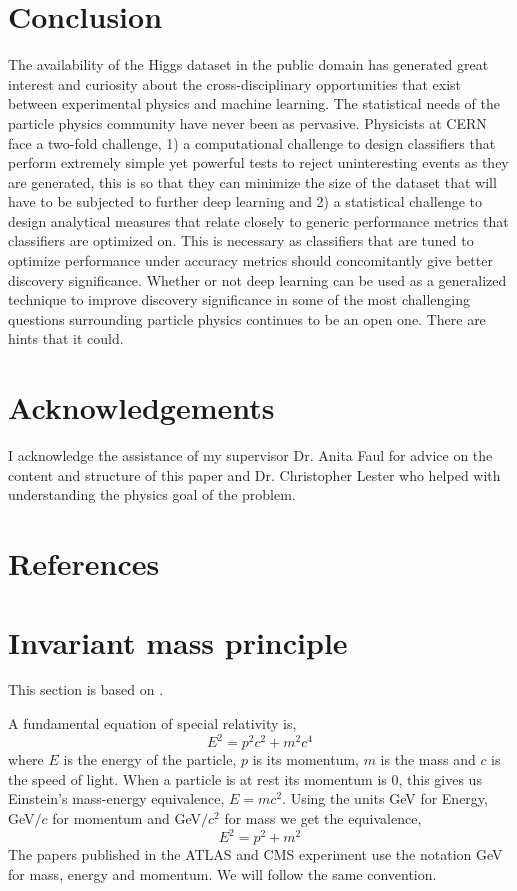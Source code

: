 \documentclass[final,3p,times,twocolumn]{elsarticle}
\begin{document}
\section{Conclusion}
The availability of the Higgs dataset in the public domain has generated great interest and curiosity about the cross-disciplinary opportunities that exist between experimental physics and machine learning. The statistical needs of the particle physics community have never been as pervasive. Physicists at CERN face a two-fold challenge, 1) a computational challenge to design classifiers that perform extremely simple yet powerful tests to reject uninteresting events as they are generated, this is so that they can minimize the size of the dataset that will have to be subjected to further deep learning and 2) a statistical challenge to design analytical measures that relate closely to generic performance metrics that classifiers are optimized on. This is necessary as classifiers that are tuned to optimize performance under accuracy metrics should concomitantly give better discovery significance. Whether or not deep learning can be used as a generalized technique to improve discovery significance in some of the most challenging questions surrounding particle physics continues to be an open one. There are hints that it could. 

\section*{Acknowledgements}

I acknowledge the assistance of my supervisor Dr. Anita Faul for advice on the content and structure of this paper and Dr. Christopher Lester who helped with understanding the physics goal of the problem. 

\section*{References}
 


\appendix

\section{Invariant mass principle}

\label{AppA}

This section is based on \cite{RM}.

A fundamental equation of special relativity is, $$ E^2 = p^2c^2 + m^2c^4 $$ where $E$ is the energy of the particle, $p$ is its momentum, $m$ is the mass and $c$ is the speed of light. When a particle is at rest its momentum is 0, this gives us Einstein's mass-energy equivalence, $E = mc^2$.  Using the units GeV for Energy, GeV$/c$ for momentum and GeV$/c^2$ for mass we get the equivalence,  $$E^2 = p^2 + m^2 $$ The papers published in the ATLAS and CMS experiment use the notation GeV for mass, energy and momentum. We will follow the same convention.
\end{document}
